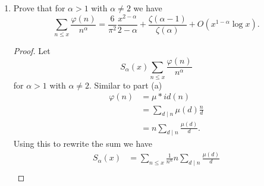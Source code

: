 \documentclass[12pt]{article}
\begin{document}
\begin{enumerate}[label=(\alph*)]
\begin{proof}
\begin{align*}
            \sum_{d\leq x}\frac{\mu(d)\log d}{d^2}&=\sum_{d=1}^{\infty}\frac{\mu(d)\log d}{d^2}+O\left(\frac{\log x}{x}\right)\\
            &=A+O\left(\frac{\log x}{x}\right).
        \end{align*}
        \begin{align*}
            O\left(\frac{d}{x}\sum_{d\leq x}\frac{\mu(d)}{d^2}\right)&=O\left(\frac{1}{x}\sum_{d\leq x}\frac{|\mu(d)|}{d}\right)\\
            &=O\left(\frac{1}{x}\sum_{d\leq x}\frac{1}{d}\right)\\
            &=O\left(\frac{1}{x}O(\log x)\right)\\
            &=O\left(\frac{\log x}{x}\right).
        \end{align*}
        Combining terms we have
        \begin{align*}
            S(x)&=\log x\sum_{d\leq x}\frac{\mu(d)}{d^2}-\sum_{d\leq x}\frac{\mu(d)\log d}{d^2}+\gamma\sum_{d\leq x}\frac{\mu(d)}{d^2}+O\left(\frac{d}{x}\sum_{d\leq x}\frac{\mu(d)}{d^2}\right)\\
            &=\log x\left(\frac{6}{\pi^2}+O\left(\frac{1}{x}\right)\right)+\gamma\left(\frac{6}{\pi^2}+O\left(\frac{1}{x}\right)\right)-A+O\left(\frac{\log x}{x}\right)+O\left(\frac{\log x}{x}\right)\\
            &=\frac{6}{\pi^2}\log x+\frac{6\gamma}{\pi^2}-A+O\left(\frac{\log x}{x}\right).\qedhere
        \end{align*}
    \end{proof}
    \newpage
    \item Prove that for $\alpha>1$ with $\alpha\neq2$ we have
    \[
        \sum_{n\leq x}\frac{\varphi(n)}{n^\alpha}=\frac{6}{\pi^2}\frac{x^{2-\alpha}}{2-\alpha}+\frac{\zeta(\alpha-1)}{\zeta(\alpha)}+O(x^{1-\alpha}\log x ). 
    \]
    \begin{proof}
        Let
        \[
            S_\alpha(x)\sum_{n\leq x}\frac{\varphi(n)}{n^\alpha}
        \]
        for $\alpha>1$ with $\alpha\neq2$.
        Similar to part (a)
        \begin{align*}
            \varphi(n)&=\mu\ast id(n)\\
            &=\sum_{d\mid n}\mu(d)\frac{n}{d}\\
            &=n\sum_{d\mid n}\frac{\mu(d)}{d}.
        \end{align*}
        Using this to rewrite the sum we have
        \begin{align*}
            S_\alpha(x)&=\sum_{n\leq x}\frac{1}{n^\alpha}n\sum_{d\mid n}\frac{\mu(d)}{d}\\

\end{align*}
\end{proof}
\end{enumerate}
\end{document}
